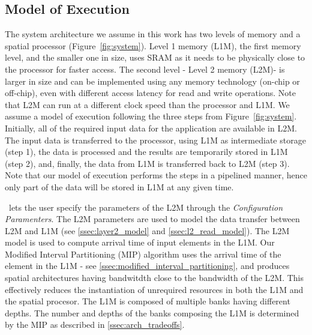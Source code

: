 \vspace{-1mm}
\subsection{Model of Execution}
\label{ssec:system_under_analysis}
\vspace{-1mm}
The system architecture we assume in this work has two levels of memory and a spatial processor (Figure~\ref{fig:system}). Level 1 memory (L1M)\footnotemark, the first memory level, and the smaller one in size, uses SRAM as it needs to be physically close to the processor for faster access. The second level - Level 2 memory (L2M)\footnotemark[\value{footnote}] - is larger in size and can be implemented using any memory technology (on-chip or off-chip), even with different access latency for read and write operations. Note that L2M can run at a different clock speed than the processor and L1M.
We assume a model of execution following the three steps from Figure~\ref{fig:system}. Initially, all of the required input data for the application are available in L2M. The input data is transferred to the processor, using L1M as intermediate storage (step 1), the data is processed and the results are temporarily stored in L1M (step 2), and, finally, the data from L1M is transferred back to L2M (step 3). Note that our model of execution performs the steps in a pipelined manner, hence only part of the data will be stored in L1M at any given time.

\frameworkname~lets the user specify the parameters of the L2M through the \textit{Configuration Paramenters}. The L2M parameters are used to model the data transfer between L2M and L1M (see \ref{ssec:layer2_model} and \ref{ssec:l2_read_model}). The L2M model is used to compute arrival time of input elements in the L1M. Our Modified Interval Partitioning (MIP) algorithm uses the arrival time of the element in the L1M - see \ref{ssec:modified_interval_partitioning}, and produces spatial architectures having bandwitdth close to the bandwidth of the L2M. This effectively reduces the instantiation of unrequired resources in both the L1M and the spatial procesor.
The L1M is composed of multiple banks having different depths. The number and depths of the banks composing the L1M is determined by the MIP as described in \ref{ssec:arch_tradeoffs}.

